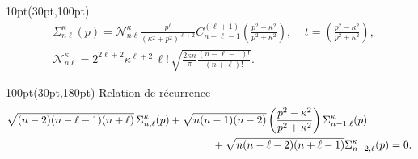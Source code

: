 \begin{frame}
\begin{textblock*}{10pt}(30pt,100pt)
\footnotesize
\begin{equation*}
 \begin{split}
 & \Sigma_{n\ell}^\kappa (p)
    = \mathcal{N}_{n\ell}^\kappa \frac{p^\ell}{(\kappa^2 + p^2)^{\ell+2}}
      C_{n-\ell-1}^{(\ell+1)}
  \left(\frac{p^2 - \kappa^2}{p^2 + \kappa^2} \right), 
 \;\;\;\; t=\left( \frac{p^2 - \kappa^2}{p^2 + \kappa^2} \right), \\
  & \mathcal{N}_{n\ell}^\kappa = 2^{2\ell+2}\kappa^{\ell+2}\,\ell!\,
      \sqrt{\frac{2\kappa n}{\pi}\frac{(n-\ell-1)!}{(n+\ell)!}}.
 \end{split}
\end{equation*}

\end{textblock*}


\begin{textblock*}{100pt}(30pt,180pt)
\footnotesize
Relation de r\'ecurrence
\begin{equation*}
 \begin{split}
\sqrt{(n-2)(n-\ell-1)(n+\ell)} \, & \Sigma_{n,\ell}^\kappa (p)
   + \sqrt{n(n-1)(n-2)} \left( \frac{p^2 -\kappa^2}{p^2+\kappa^2} \right)
     \Sigma_{n-1,\ell}^\kappa (p) \\
    & \hspace{25mm} + \sqrt{n(n-\ell-2)(n+\ell-1)} \Sigma_{n-2,\ell}^\kappa (p) = 0.
 \end{split}
\end{equation*}

\end{textblock*}



\end{frame}


